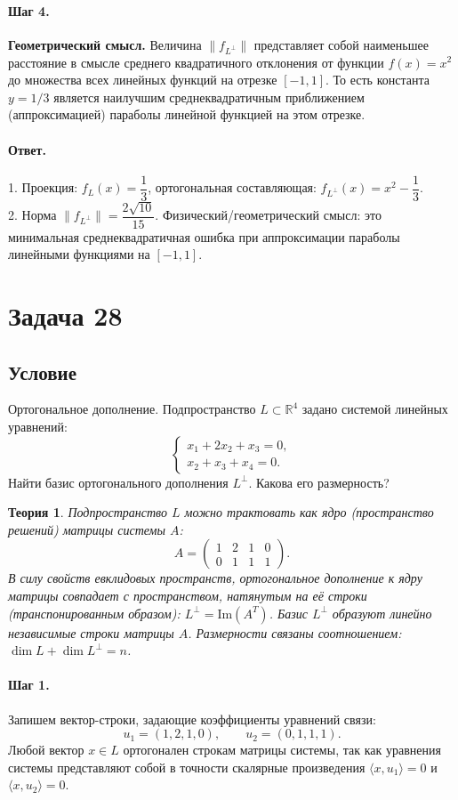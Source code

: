 \documentclass[12pt,a4paper]{article}
\theoremstyle{solution}
\newtheorem*{theory}{Теория}
\newcommand{\task}[1]{\newpage\section*{Задача #1}}
\newcommand{\answer}{\paragraph{Ответ.}}
\newcommand{\step}[1]{\paragraph{Шаг #1.}}
\newcommand{\R}{\mathbb{R}}
\begin{document}
\step{4} \textbf{Геометрический смысл.} Величина $\|f_{L^\perp}\|$ представляет собой наименьшее расстояние в смысле среднего квадратичного отклонения от функции $f(x) = x^2$ до множества всех линейных функций на отрезке $[-1, 1]$. То есть константа $y = 1/3$ является наилучшим среднеквадратичным приближением (аппроксимацией) параболы линейной функцией на этом отрезке.

\answer
1. Проекция: $f_L(x) = \dfrac{1}{3}$, ортогональная составляющая: $f_{L^\perp}(x) = x^2 - \dfrac{1}{3}$.\\
2. Норма $\|f_{L^\perp}\| = \dfrac{2\sqrt{10}}{15}$. Физический/геометрический смысл: это минимальная среднеквадратичная ошибка при аппроксимации параболы линейными функциями на $[-1, 1]$.

\task{28}
\subsection*{Условие}
Ортогональное дополнение. Подпространство $L \subset \R^4$ задано системой линейных уравнений:
\[
\begin{cases}
x_1 + 2x_2 + x_3 = 0, \\
x_2 + x_3 + x_4 = 0.
\end{cases}
\]
Найти базис ортогонального дополнения $L^\perp$. Какова его размерность?

\begin{theory}
Подпространство $L$ можно трактовать как ядро (пространство решений) матрицы системы $A$:
\[
A = \begin{pmatrix} 1 & 2 & 1 & 0 \\ 0 & 1 & 1 & 1 \end{pmatrix}.
\]
В силу свойств евклидовых пространств, ортогональное дополнение к ядру матрицы совпадает с пространством, натянутым на её строки (транспонированным образом): $L^\perp = \mathrm{Im}(A^T)$. Базис $L^\perp$ образуют линейно независимые строки матрицы $A$. Размерности связаны соотношением: $\dim L + \dim L^\perp = n$.
\end{theory}

\step{1} Запишем вектор-строки, задающие коэффициенты уравнений связи:
\[
u_1 = (1, 2, 1, 0), \qquad u_2 = (0, 1, 1, 1).
\]
Любой вектор $x \in L$ ортогонален строкам матрицы системы, так как уравнения системы представляют собой в точности скалярные произведения $\langle x, u_1\rangle = 0$ и $\langle x, u_2\rangle = 0$.
\end{document}
